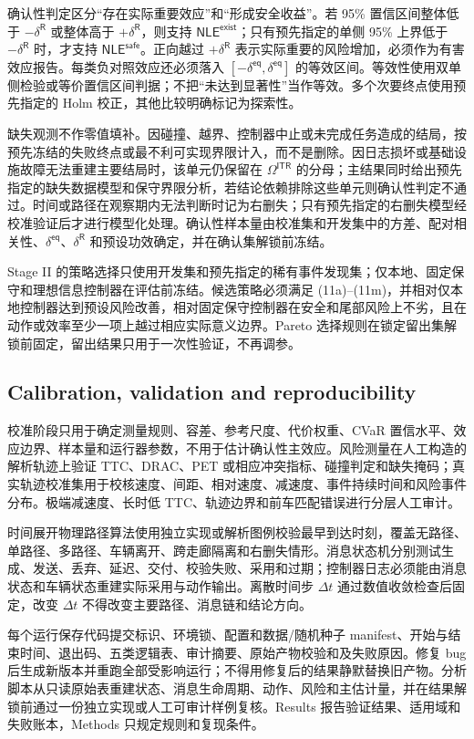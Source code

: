 \documentclass[10pt,a4paper,twocolumn]{article}
\begin{document}
确认性判定区分“存在实际重要效应”和“形成安全收益”。若 95\% 置信区间整体低于 $-\delta^{\mathsf R}$ 或整体高于 $+\delta^{\mathsf R}$，则支持 $\mathsf{NLE}^{\mathsf{exist}}$；只有预先指定的单侧 95\% 上界低于 $-\delta^{\mathsf R}$ 时，才支持 $\mathsf{NLE}^{\mathsf{safe}}$。正向越过 $+\delta^{\mathsf R}$ 表示实际重要的风险增加，必须作为有害效应报告。每类负对照效应还必须落入 $[-\delta^{\mathsf{eq}},\delta^{\mathsf{eq}}]$ 的等效区间。等效性使用双单侧检验或等价置信区间判据；不把“未达到显著性”当作等效。多个次要终点使用预先指定的 Holm 校正，其他比较明确标记为探索性。

缺失观测不作零值填补。因碰撞、越界、控制器中止或未完成任务造成的结局，按预先冻结的失败终点或最不利可实现界限计入，而不是删除。因日志损坏或基础设施故障无法重建主要结局时，该单元仍保留在 $\Omega^{\mathsf{ITR}}$ 的分母；主结果同时给出预先指定的缺失数据模型和保守界限分析，若结论依赖排除这些单元则确认性判定不通过。时间或路径在观察期内无法判断时记为右删失；只有预先指定的右删失模型经校准验证后才进行模型化处理。确认性样本量由校准集和开发集中的方差、配对相关性、$\delta^{\mathsf{eq}}$、$\delta^{\mathsf R}$ 和预设功效确定，并在确认集解锁前冻结。

Stage II 的策略选择只使用开发集和预先指定的稀有事件发现集；仅本地、固定保守和理想信息控制器在评估前冻结。候选策略必须满足 (11a)--(11m)，并相对仅本地控制器达到预设风险改善，相对固定保守控制器在安全和尾部风险上不劣，且在动作或效率至少一项上越过相应实际意义边界。Pareto 选择规则在锁定留出集解锁前固定，留出结果只用于一次性验证，不再调参。

\subsection*{Calibration, validation and reproducibility}
校准阶段只用于确定测量规则、容差、参考尺度、代价权重、CVaR 置信水平、效应边界、样本量和运行器参数，不用于估计确认性主效应。风险测量在人工构造的解析轨迹上验证 TTC、DRAC、PET 或相应冲突指标、碰撞判定和缺失掩码；真实轨迹校准集用于校核速度、间距、相对速度、减速度、事件持续时间和风险事件分布。极端减速度、长时低 TTC、轨迹边界和前车匹配错误进行分层人工审计。

时间展开物理路径算法使用独立实现或解析图例校验最早到达时刻，覆盖无路径、单路径、多路径、车辆离开、跨走廊隔离和右删失情形。消息状态机分别测试生成、发送、丢弃、延迟、交付、校验失败、采用和过期；控制器日志必须能由消息状态和车辆状态重建实际采用与动作输出。离散时间步 $\Delta t$ 通过数值收敛检查后固定，改变 $\Delta t$ 不得改变主要路径、消息链和结论方向。

每个运行保存代码提交标识、环境锁、配置和数据/随机种子 manifest、开始与结束时间、退出码、五类逻辑表、审计摘要、原始产物校验和及失败原因。修复 bug 后生成新版本并重跑全部受影响运行；不得用修复后的结果静默替换旧产物。分析脚本从只读原始表重建状态、消息生命周期、动作、风险和主估计量，并在结果解锁前通过一份独立实现或人工可审计样例复核。Results 报告验证结果、适用域和失败账本，Methods 只规定规则和复现条件。
\end{document}
